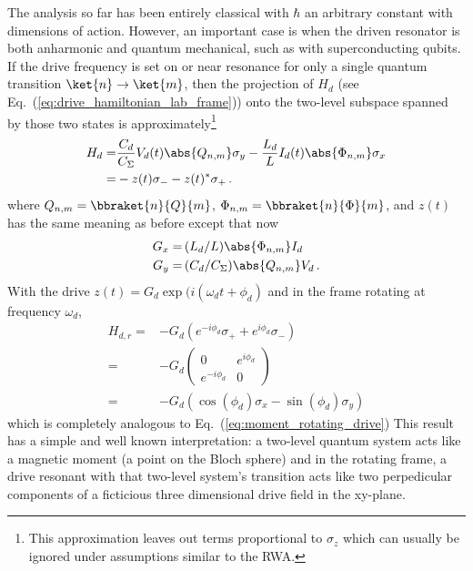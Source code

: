 
The analysis so far has been entirely classical with $\hbar$ an arbitrary constant with dimensions of action.
However, an important case is when the driven resonator is both anharmonic and quantum mechanical, such as with superconducting qubits.
If the drive frequency is set on or near resonance for only a single quantum transition $\ket{n} \rightarrow \ket{m}$, then the projection of $H_d$ (see Eq.~(\ref{eq:drive_hamiltonian_lab_frame})) onto the two-level subspace spanned by those two states is approximately\footnote{This approximation leaves out terms proportional to $\sigma_z$ which can usually be ignored under assumptions similar to the RWA.}
\begin{align}
  H_d
  =&
      \frac{C_d}{C_\Sigma} V_d(t) \abs{Q_{n,m}} \sigma_y
    - \frac{L_d}{L} I_d(t) \abs{\Phi_{n,m}} \sigma_x \nonumber \\
  =& - z(t) \sigma_- - z(t)^* \sigma_+
  \, .
\end{align}
where $Q_{n,m} = \bbraket{n}{Q}{m}$, $\Phi_{n,m} = \bbraket{n}{\Phi}{m}$, and $z(t)$ has the same meaning as before except that now
\begin{align*}
  G_x =& \, (L_d / L) \abs{\Phi_{n,m}} I_d \\
  G_y =& \, (C_d / C_\Sigma) \abs{Q_{n,m}} V_d
  \, .
\end{align*}
With the drive $z(t) = G_d \exp(i (\omega_d t + \phi_d)$ and in the frame rotating at frequency $\omega_d$,
\begin{align}
  H_{d,r}
  =& - G_d \left( e^{-i \phi_d} \sigma_+ + e^{i \phi_d} \sigma_- \right) \nonumber \\
  =& - G_d \begin{pmatrix}
    0 & e^{i \phi_d} \\ e^{-i \phi_d} & 0
  \end{pmatrix} \nonumber \\
  =& - G_d \left( \cos(\phi_d) \sigma_x - \sin(\phi_d) \sigma_y \right)
\end{align}
which is completely analogous to Eq.~(\ref{eq:moment_rotating_drive})
This result has a simple and well known interpretation:
a two-level quantum system acts like a magnetic moment (a point on the Bloch sphere) and in the rotating frame, a drive resonant with that two-level system's transition acts like two perpedicular components of a ficticious three dimensional drive field in the xy-plane.
